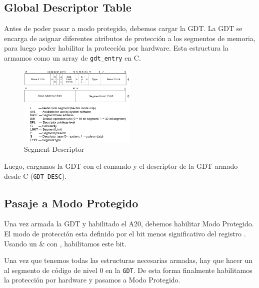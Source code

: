 \subsection{Global Descriptor Table}
Antes de poder pasar a modo protegido, debemos cargar la GDT. La GDT se encarga de asignar diferentes atributos de protección a los segmentos de memoria, para luego poder habilitar la protección por hardware. Esta estructura la armamos como un array de \texttt{gdt\_entry} en C.

\begin{figure}[h!]
  \centering
    \includegraphics[width=0.5\textwidth]{images/segment_descriptor}
  \caption{Segment Descriptor}
\end{figure}

Luego, cargamos la GDT con el comando  y el descriptor de la GDT armado desde C (\texttt{GDT\_DESC}).

\subsection{Pasaje a Modo Protegido}
Una vez armada la GDT y habilitado el A20, debemos habilitar Modo Protegido. El modo de protección esta definido por el bit menos significativo del registro . Usando un \& con , habilitamos este bit.

Una vez que tenemos todas las estructuras necesarias armadas, hay que hacer un  al segmento de código de nivel 0 en la \texttt{GDT}. De esta forma finalmente habilitamos la protección por hardware y pasamos a Modo Protegido. 

